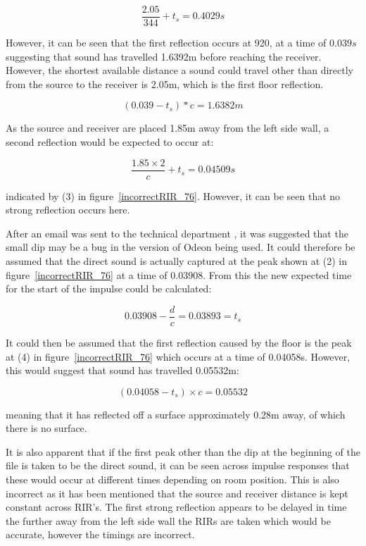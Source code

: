 \documentclass[../../main.tex]{subfiles}
\begin{document}
			\begin{equation}
			\frac{2.05}{344} + t_s = 0.4029s
			\end{equation}

			However, it can be seen that the first reflection occurs at 920, at a time of $0.039s$ suggesting that sound has travelled 1.6392m before reaching the receiver. However, the shortest available distance a sound could travel other than directly from the source to the receiver is 2.05m, which is the first floor reflection.

			\begin{equation}
			(0.039 - t_s)*c = 1.6382m
			\end{equation}

			As the source and receiver are placed 1.85m away from the left side wall, a second reflection would be expected to occur at:

			\begin{equation}
			\frac{1.85\times{2}}{c} + t_s = 0.04509s
			\end{equation}

			indicated by (3) in figure~\ref{incorrectRIR_76}. However, it can be seen that no strong reflection occurs here.

			After an email was sent to the technical department \cite{odeonEmail}, it was suggested that the small dip may be a bug in the version of Odeon being used. It could therefore be assumed that the direct sound is actually captured at the peak shown at (2) in figure~\ref{incorrectRIR_76} at a time of $0.03908$. From this the new expected time for the start of the impulse could be calculated:

			\begin{equation}
			0.03908 - \frac{d}{c} = 0.03893 = t_s
			\end{equation}

			It could then be assumed that the first reflection caused by the floor is the peak at (4) in figure~\ref{incorrectRIR_76} which occurs at a time of 0.04058s. However, this would suggest that sound has travelled 0.05532m:

			\begin{equation}
			(0.04058 - t_s)\times{c} = 0.05532
			\end{equation}

			meaning that it has reflected off a surface approximately 0.28m away, of which there is no surface.

			It is also apparent that if the first peak other than the dip at the beginning of the file is taken to be the direct sound, it can be seen across impulse responses that these would occur at different times depending on room position. This is also incorrect as it has been mentioned that the source and receiver distance is kept constant across \ac{RIR}’s. The first strong reflection appears to be delayed in time the further away from the left side wall the RIRs are taken which would be accurate, however the timings are incorrect.
\end{document}
